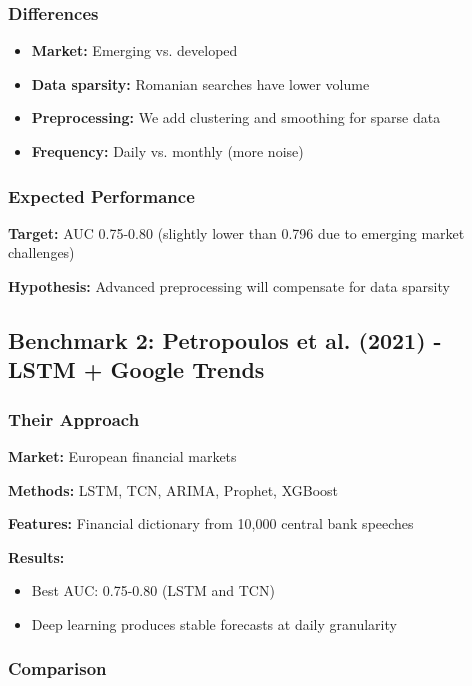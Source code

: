 \documentclass[12pt,a4paper]{article}
\begin{document}
\subsubsection{Differences}
\begin{itemize}
    \item \textbf{Market:} Emerging vs. developed
    \item \textbf{Data sparsity:} Romanian searches have lower volume
    \item \textbf{Preprocessing:} We add clustering and smoothing for sparse data
    \item \textbf{Frequency:} Daily vs. monthly (more noise)
\end{itemize}

\subsubsection{Expected Performance}

\textbf{Target:} AUC 0.75-0.80 (slightly lower than 0.796 due to emerging market challenges)

\textbf{Hypothesis:} Advanced preprocessing will compensate for data sparsity

\subsection{Benchmark 2: Petropoulos et al. (2021) - LSTM + Google Trends}

\subsubsection{Their Approach}

\textbf{Market:} European financial markets

\textbf{Methods:} LSTM, TCN, ARIMA, Prophet, XGBoost

\textbf{Features:} Financial dictionary from 10,000 central bank speeches

\textbf{Results:}
\begin{itemize}
    \item Best AUC: 0.75-0.80 (LSTM and TCN)
    \item Deep learning produces stable forecasts at daily granularity
\end{itemize}

\subsubsection{Comparison}
\end{document}
